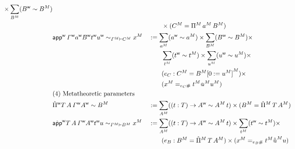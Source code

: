 \begin{definition}
\begin{alignat*}{5}
      \times
      \sum_{\model{B}} (\wf{B}\sim\model{B})
      \\
      &&& \qquad \times (\model{C}= \model{\Pi}\,\model{a}\,\model{B})
  \\
  &
  \relt{\appw\, \wf{\GG} \wf{a} \wf{B} \wf{t} \wf{u}}{\model{\GG}}{\model{C}}{\model{x}}  &&
    :=
      \sum_{\model{a}} (\wf{a}\sim\model{a})
      \times
      \sum_{\model{B}} (\wf{B}\sim\model{B})
      \times
      \\
      & && \qquad
      \sum_{\model{t}} (\wf{t}\sim\model{t})
      \times
      \sum_{\model{u}} (\wf{u}\sim\model{u})
      \times
      \\
      & &&
     \qquad  (e_C : \model{C} = \model{B}\model{[0 := \model{u}]})
      \times
      \\
      & &&
      \qquad
      (\model{x} = _{e_C \#} \model{t} \model{\oldapp}\model{u})
    \\
  & \rlap{(4) Metatheoretic parameters} \\
  & \Pimw T\,A\,\wf{\GG}\wf{A} \sim \model{B} &&
    :=
      \sum_{\model{A}} ((t : T) \ra \wf{A}\sim\model{A}\, t)
      \times
      (\model{B} = \model{\Pim}\,T\,\model{A})
    \\
    & \relt{\appmw T\,A\,\wf{\GG}\wf{A} \wf{t} u}{\model{\GG}}{\model{B}}{\model{x}}
     &&
     :=
      \sum_{\model{A}} ((t : T) \ra \wf{A}\sim\model{A}\, t)
      \times
      \sum_{\model{t}} (\wf{t}\sim\model{t})
      \times
      \\ & &&
      \qquad
      (e_B : \model{B} = \model{\Pim}\,T\,\model{A})
      \times
      (\model{x} = _{e_B \#} \model{t}\model{\hat{\oldapp}}u)
\end{alignat*}
\end{definition}

